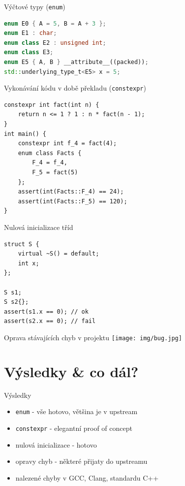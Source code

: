 \documentclass[11pt]{beamer}
\begin{document}
\begin{frame}[fragile]{Výčtové typy (\texttt{enum})}
\begin{lstlisting}[language=C++]
enum E0 { A = 5, B = A + 3 };
enum E1 : char;
enum class E2 : unsigned int;
enum class E3;
enum E5 { A, B } __attribute__((packed));
std::underlying_type_t<E5> x = 5;
\end{lstlisting}
\end{frame}

\begin{frame}[fragile]{Vykonávání kódu v době překladu (\texttt{constexpr})}
\begin{lstlisting}
constexpr int fact(int n) {
	return n <= 1 ? 1 : n * fact(n - 1);
}
int main() {
	constexpr int f_4 = fact(4);
	enum class Facts {
		F_4 = f_4,
		F_5 = fact(5)
	};
	assert(int(Facts::F_4) == 24);
	assert(int(Facts::F_5) == 120);
}
\end{lstlisting}
\end{frame}

\begin{frame}[fragile]{Nulová inicializace tříd}
\begin{lstlisting}
struct S {
	virtual ~S() = default;
	int x;
};

S s1;
S s2{};
assert(s1.x == 0); // ok
assert(s2.x == 0); // fail
\end{lstlisting}
\end{frame}

\begin{frame}{Oprava stávajících chyb v projektu}
\texttt{[image: img/bug.jpg]}
\end{frame}




\section{Výsledky \& co dál?}

\begin{frame}{Výsledky}
\begin{itemize}
\pause \item \texttt{enum} - vše hotovo, většina je v upstream
\pause \item \texttt{constexpr} - elegantní proof of concept
\pause \item nulová inicializace - hotovo
\pause \item opravy chyb - některé přijaty do upstreamu
\pause \item nalezené chyby v GCC, Clang, standardu C++
\end{itemize}
\end{frame}
\end{document}
